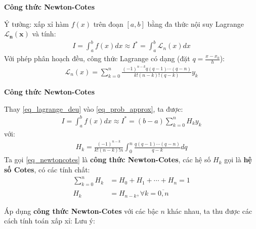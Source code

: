 \documentclass[12pt]{article}
\begin{document}
\newpage{}

\textbf{Công thức Newton-Cotes}

Ý tưởng: xấp xỉ hàm $f(x)$ trên đoạn $[a,b]$ bằng đa thức nội suy Lagrange $\mathbf{\mathcal{L}_n(x)}$ và tính:
\begin{align}\label{eq_prob_approx}
 I = \int_a^b f(x) dx \approx I^* = \int_a^b \mathcal{L}_n(x) dx
\end{align}
Với phép phân hoạch đều, công thức Lagrange có dạng (đặt $q=\frac{x-x_0}{h}$):
\begin{align}\label{eq_lagrange_deu}
 \mathcal{L}_n(x) = \sum_{k=0}^n \frac{(-1)^{n-k} q(q-1)\cdots (q-n)}{k!(n-k)!(q-k)}y_k
\end{align}

\newpage{}

\textbf{Công thức Newton-Cotes}

Thay \eqref{eq_lagrange_deu} vào \eqref{eq_prob_approx}, ta được:
\begin{align}\label{eq_newtoncotes}
 I = \int_a^b f(x) dx \approx I^* = (b-a) \sum_{k=0}^n H_k y_k
\end{align}
với:
\begin{align}
H_k = \frac{(-1)^{n-k}}{k!(n-k)!n} \int_0^n \frac{q(q-1)\cdots (q-n)}{q-k} dq
\end{align}
Ta gọi \eqref{eq_newtoncotes} là \textbf{công thức Newton-Cotes}, các hệ số $H_k$ gọi là \textbf{hệ số Cotes}, có các tính chất:
\begin{align}
 \sum_{k=0}^n H_k &= H_0 + H_1 + \cdots + H_n = 1 \\
 H_k &= H_{n-k}, \forall k=\overline{0,n}
\end{align}

\newpage{}

Áp dụng \textbf{công thức Newton-Cotes} với các bậc $n$ khác nhau, ta thu được các cách tính toán xấp xỉ:
Lưu ý:

\end{document}
